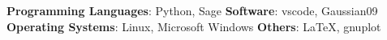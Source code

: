
\textbf{Programming Languages}: Python, Sage
\break
\textbf{Software}: vscode, Gaussian09
\break
\textbf{Operating Systems}: Linux, Microsoft Windows
\break
\textbf{Others}: \LaTeX, gnuplot
